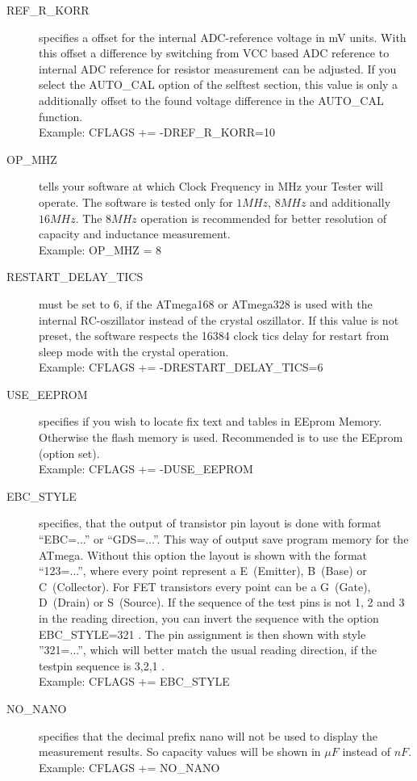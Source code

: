\begin{description}
  \item[REF\_R\_KORR] specifies a offset for the internal ADC-reference voltage in mV units.
With this offset a difference by switching from VCC based ADC reference to internal ADC reference for resistor measurement can be adjusted.
If you select the AUTO\_CAL option of the selftest section, this value is only a additionally offset to the found voltage 
difference in the AUTO\_CAL function.\\
Example: CFLAGS += -DREF\_R\_KORR=10

  \item[OP\_MHZ] tells your software at which Clock Frequency in MHz your Tester will operate.
The software is tested only for \(1MHz\), \(8MHz\) and additionally \(16MHz\). 
The \(8MHz\) operation is recommended for better resolution of capacity and inductance measurement.\\
Example: OP\_MHZ = 8

  \item[RESTART\_DELAY\_TICS] must be set to 6, if the ATmega168 or ATmega328 is used with the internal RC-oszillator instead of
the crystal oszillator.
If this value is not preset, the software respects the 16384 clock tics delay for restart from sleep mode with the crystal operation.\\
Example: CFLAGS += -DRESTART\_DELAY\_TICS=6

  \item[USE\_EEPROM] specifies if you wish to locate fix text and tables in EEprom Memory. Otherwise the flash memory is used.
Recommended is to use the EEprom (option set).\\
Example: CFLAGS += -DUSE\_EEPROM

\item[EBC\_STYLE] specifies, that the output of transistor pin layout is done with format ``EBC=...'' or ``GDS=...''.
This way of output save program memory for the ATmega. Without this option the layout is shown with the
format ``123=...'', where every point represent a E~(Emitter), B~(Base) or C~(Collector).
For FET transistors every point can be a G~(Gate), D~(Drain) or S~(Source).
If the sequence of the test pins is not 1, 2 and 3 in the reading direction, you can invert the sequence with the option
EBC\_STYLE=321 . The pin assignment is then shown with style ''321=...'', which will better match the usual
reading direction, if the testpin sequence is 3,2,1 .\\
Example: CFLAGS += EBC\_STYLE

  \item[NO\_NANO] specifies that the decimal prefix nano will not be used to display the measurement results.
So capacity values will be shown in \(\mu F\) instead of \(nF\).\\
Example: CFLAGS += NO\_NANO


\end{description}
